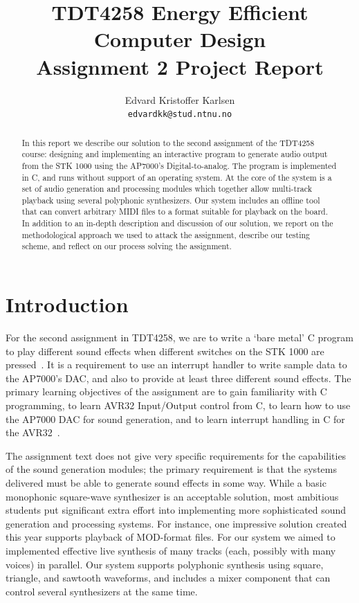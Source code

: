\documentclass[a4paper,9pt]{article}
\title{
TDT4258 Energy Efficient Computer Design\\
Assignment 2 Project Report
}
\author{
  Edvard Kristoffer Karlsen\\
  \texttt{edvardkk@stud.ntnu.no}
}
\date {}
\begin{document}
\maketitle

\begin{abstract}
  In this report we describe our solution to the second assignment of the
  TDT4258 course: designing and implementing an interactive program to
  generate audio output from the STK 1000 using the AP7000's
  Digital-to-analog.  The program is implemented in C, and runs without
  support of an operating system. At the core of the system is a set of audio
  generation and processing modules which together allow multi-track playback
  using several polyphonic synthesizers. Our system includes an offline tool
  that can convert arbitrary MIDI files to a format suitable for playback on
  the board.  In addition to an in-depth description and discussion of our
  solution, we report on the methodological approach we used to attack the
  assignment, describe our testing scheme, and reflect on our process solving
  the assignment.
\end{abstract}

\section{Introduction}

For the second assignment in TDT4258, we are to write a `bare metal' C program
to play different sound effects when different switches on the STK 1000 are
pressed~\cite{compendium}. It is a requirement to use an interrupt handler to
write sample data to the AP7000's DAC, and also to provide at least three
different sound effects. The primary learning objectives of the assignment are
to gain familiarity with C programming, to learn AVR32 Input/Output control
from C, to learn how to use the AP7000 DAC for sound generation, and to learn
interrupt handling in C for the AVR32~\cite{compendium}.

The assignment text does not give very specific requirements for the
capabilities of the sound generation modules; the primary requirement is that
the systems delivered must be able to generate sound effects in some way.
While a basic monophonic square-wave synthesizer is an acceptable solution,
most ambitious students put significant extra effort into implementing more
sophisticated sound generation and processing systems.  For instance, one
impressive solution created this year supports playback of MOD-format files. 
For our system we aimed to implemented effective live synthesis of many tracks
(each, possibly with many voices) in parallel. Our system supports polyphonic
synthesis using square, triangle, and sawtooth waveforms, and includes a mixer
component that can control several synthesizers at the same time. 
\end{document}

